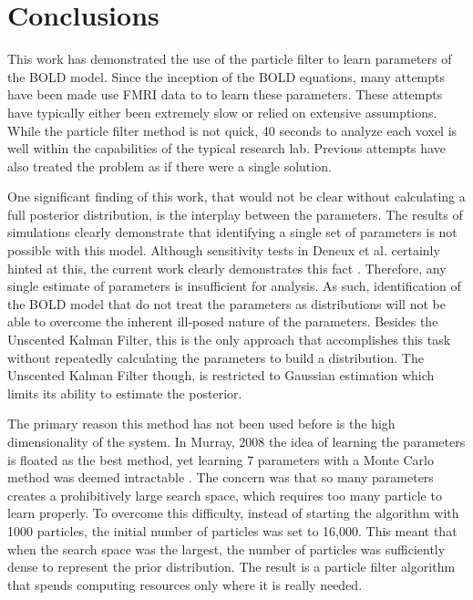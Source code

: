 \section{Conclusions}
\label{sec:Conclusion}
This work has demonstrated the use of the particle filter to
learn parameters of the BOLD model. Since the inception of the
BOLD equations, many attempts have been made use FMRI data to
to learn these parameters. These attempts have typically either been extremely
slow or relied on extensive assumptions. While the particle filter method
is not quick, 40 seconds to analyze each voxel is well within the capabilities
of the typical research lab. Previous attempts have also treated
the problem as if there were a single solution.

One significant finding of this work, that would not be clear without
calculating a full posterior distribution, is the interplay
between the parameters. The results of simulations clearly demonstrate
that identifying a single set of parameters is not possible with this
model. Although sensitivity tests in Deneux et al. certainly hinted
at this, the current work clearly demonstrates this fact \cite{Deneux2006}. Therefore,
any single estimate of parameters is insufficient for analysis. As such,
identification of the BOLD model that do not treat the parameters as distributions
will not be able to overcome the inherent ill-posed nature of the
parameters. Besides the Unscented Kalman Filter, this is the only approach
that accomplishes this task without repeatedly calculating the parameters
to build a distribution. The Unscented Kalman Filter though, is restricted
to Gaussian estimation which limits its ability to estimate the posterior.

The primary reason this method has not been used before is the high
dimensionality of the system. In Murray, 2008 the idea of learning
the parameters is floated as the best method, yet
learning 7 parameters with a Monte Carlo method was deemed intractable
\cite{Murray2008}. The
concern was that so many parameters creates a prohibitively large
search space, which requires too many particle to learn properly. To overcome
this difficulty, instead of starting the algorithm with 1000 particles,
the initial number of particles was set to 16,000. This meant that
when the search space was the largest, the number of particles was
sufficiently dense to represent the prior distribution. The result is
a particle filter algorithm that spends computing resources only where
it is really needed.

